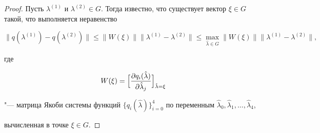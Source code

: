 \begin{proof}

    Пусть $\lambda^{( 1 ) }$  и  $\lambda^{( 2 ) }\in G$. Тогда известно,  что существует вектор  $\xi\in G$ такой,  что выполняется неравенство

    \begin{equation}

        \label{math/7}

        \bigl\|q( \lambda^{( 1 ) } ) -q( \lambda^{( 2 ) } ) \bigr\|\leq \|W( \xi ) \|\bigl\|\lambda^{( 1 ) }-\lambda^{( 2 ) }\bigr\| \leq \max_{\hat{\lambda}\in G} \|W( \xi ) \|\bigl\|\lambda^{( 1 ) }-\lambda^{( 2 ) }\bigr\|, 

    \end{equation}

    где  

        \begin{equation}

        \label{math/8}

        W( \xi ) = \Bigl[\frac{\partial q_{i}( \hat{\lambda} ) }{\partial\hat{\lambda}_j}\Bigr]_{\hat{\lambda}=\xi}    \end{equation}

     "--- матрица Якоби системы функций $\bigl\{q_i( \hat{\lambda} ) \bigr\}^{4}_{i=0}$   по переменным $\hat{\lambda}_{0}, \hat{\lambda}_{1}, \ldots, \hat{\lambda}_{4}$, 

     вычисленная в точке $\xi\in G$. 











\end{proof}
